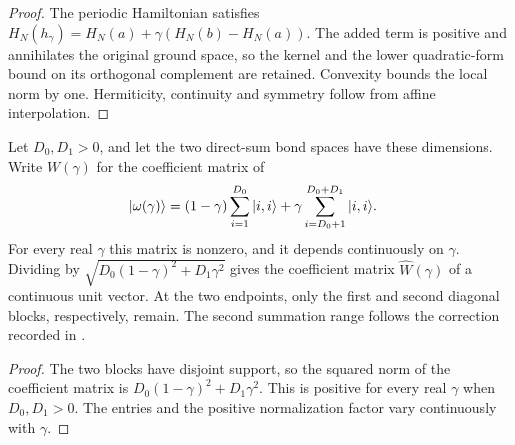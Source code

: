 \begin{proof}\leanok
    The periodic Hamiltonian satisfies
    $H_N(h_\gamma)=H_N(a)+\gamma(H_N(b)-H_N(a))$. The added term is positive
    and annihilates the original ground space, so the kernel and the
    lower quadratic-form bound on its orthogonal complement are retained.
    Convexity bounds the local norm by one. Hermiticity, continuity and
    symmetry follow from affine interpolation.
\end{proof}

\begin{lemma}
    \label{thm:spt_normalized_bond_interpolation}
    \leanok
    Let $D_0,D_1>0$, and let the two direct-sum bond spaces have these
    dimensions.  Write $W(\gamma)$ for the coefficient matrix of
    \begin{align}
        |\omega(\gamma)\rangle
         & =(1-\gamma)\sum_{i=1}^{D_0}|i,i\rangle
        +\gamma\sum_{i=D_0+1}^{D_0+D_1}|i,i\rangle.
        \notag
    \end{align}
    For every real $\gamma$ this matrix is nonzero, and it depends
    continuously on $\gamma$.  Dividing by
    $\sqrt{D_0(1-\gamma)^2+D_1\gamma^2}$ gives the coefficient matrix
    $\widehat W(\gamma)$ of a continuous unit vector.  At the two endpoints,
    only the first and second diagonal blocks, respectively, remain.  The
    second summation range follows the correction recorded in
    \cite{gap:spc11_spt_interpolation_upper_range}.
\end{lemma}

\begin{proof}\leanok
    The two blocks have disjoint support, so the squared norm of the
    coefficient matrix is $D_0(1-\gamma)^2+D_1\gamma^2$.  This is positive
    for every real $\gamma$ when $D_0,D_1>0$.  The entries and the positive
    normalization factor vary continuously with $\gamma$.
\end{proof}


